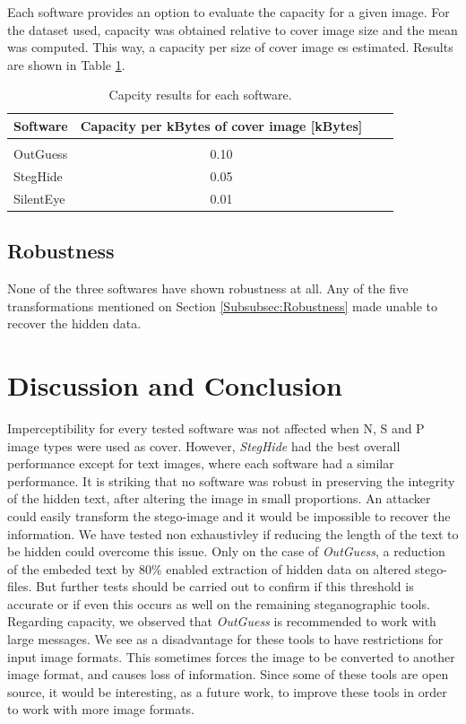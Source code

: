 \documentclass[11pt]{article}
\begin{document}
Each software provides an option to evaluate the capacity for a given image. For the dataset used, capacity was obtained
relative to cover image size and the mean was computed. This way, a capacity per size of cover image
es estimated. Results are shown in Table \ref{Tab:Capacity}.


\begin{table}[!h] 
\caption{Capcity results for each software.}
\label{Tab:Capacity}
\begin{tabular}{lclc}
\hline
\hline 
Software &  Capacity per kBytes of cover image [kBytes] \\
\hline
\midrule
{}       &   \\
OutGuess  &  0.10  \\
StegHide  &  0.05 \\
SilentEye   &  0.01 \\
\hline
\end{tabular}
\end{table}


\subsection{Robustness}

None of the three softwares have shown robustness at all. Any of the five transformations mentioned on Section 
\ref{Subsubsec:Robustness} made unable to recover the hidden data.

\section{Discussion and Conclusion}
Imperceptibility for every tested software was not affected when N, S and P image types were used as cover.
However, \textit{StegHide} had the best overall performance except for text images, where each software had a similar performance. 
It is striking that no software was robust in preserving the integrity of the hidden text, after altering the image in small proportions.
An attacker could easily transform the stego-image and it would be impossible to recover the information. 
We have tested non exhaustivley if reducing the length of the text to be
hidden could overcome this issue. Only on the case of \textit{OutGuess}, a reduction of the embeded text by 80\% enabled extraction of hidden data on altered stego-files.
But further tests should be carried out to confirm
if this threshold is accurate or if even this occurs as well on the remaining steganographic tools.
Regarding capacity, we observed that \textit{OutGuess} is recommended to work with large messages.
We see as a disadvantage for these tools to have restrictions for input image formats. 
This sometimes forces the image to be converted to another image format, and causes loss of information.
Since some of these tools are open source, it would be interesting, as a future work, to improve these tools in order to work with more image formats.
\end{document}
